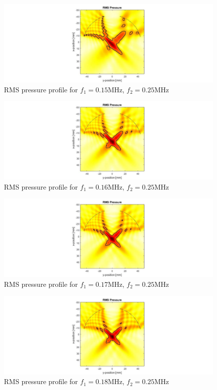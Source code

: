 \documentclass[10pt,a4paper]{article}
\begin{document}
\begin{figure}[!h]\label{f150kHz}
\hspace*{-5cm}                                                    
\includegraphics[scale=0.6]{f150kHz}
\caption{RMS pressure profile for $f_1 = 0.15$MHz, $f_2 = 0.25$MHz}
\end{figure}
\begin{figure}[!h]\label{f160kHz}
\hspace*{-5cm}                                                    
\includegraphics[scale=0.6]{f160kHz}
\caption{RMS pressure profile for $f_1 = 0.16$MHz, $f_2 = 0.25$MHz}
\end{figure}
\begin{figure}[!h]\label{f170kHz}
\hspace*{-5cm}                                                    
\includegraphics[scale=0.6]{f170kHz}
\caption{RMS pressure profile for $f_1 = 0.17$MHz, $f_2 = 0.25$MHz}
\end{figure}
\begin{figure}[!h]\label{f180kHz}
\hspace*{-5cm}                                                    
\includegraphics[scale=0.6]{f180kHz}
\caption{RMS pressure profile for $f_1 = 0.18$MHz, $f_2 = 0.25$MHz}
\end{figure}
\end{document}
